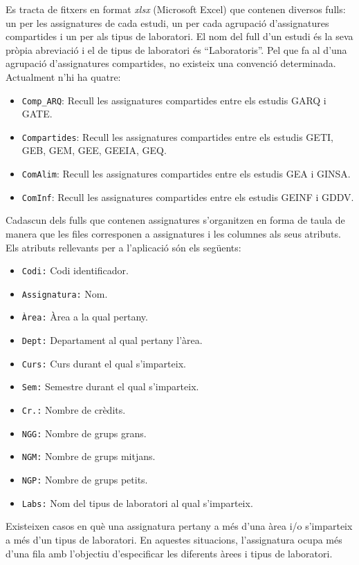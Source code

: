 \documentclass[a4paper,12pt]{ThesisStyle}
\begin{document}
Es tracta de fitxers en format \emph{xlsx} (Microsoft Excel) que contenen diversos fulls: un per les assignatures de cada estudi, un per cada agrupació d'assignatures compartides i un per als tipus de laboratori. El nom del full d'un estudi és la seva pròpia abreviació i el de tipus de laboratori és ``Laboratoris''. Pel que fa al d'una agrupació d'assignatures compartides, no existeix una convenció determinada. Actualment n'hi ha quatre:
\begin{itemize}
  \item \texttt{Comp\_ARQ}: Recull les assignatures compartides entre els estudis GARQ i GATE.
  \item \texttt{Compartides}: Recull les assignatures compartides entre els estudis GETI, GEB, GEM, GEE, GEEIA, GEQ.
  \item \texttt{ComAlim}: Recull les assignatures compartides entre els estudis GEA i GINSA.
  \item \texttt{ComInf}: Recull les assignatures compartides entre els estudis GEINF i GDDV.
\end{itemize}

Cadascun dels fulls que contenen assignatures s'organitzen en forma de taula de manera que les files corresponen a assignatures i les columnes als seus atributs. Els atributs rellevants per a l'aplicació són els següents:
\begin{itemize}
  \item \texttt{Codi:} Codi identificador.
  \item \texttt{Assignatura:} Nom.
  \item \texttt{Àrea:} Àrea a la qual pertany.
  \item \texttt{Dept:} Departament al qual pertany l'àrea.
  \item \texttt{Curs:} Curs durant el qual s'imparteix.
  \item \texttt{Sem:} Semestre durant el qual s'imparteix.
  \item \texttt{Cr.:} Nombre de crèdits.
  \item \texttt{NGG:} Nombre de grups grans.
  \item \texttt{NGM:} Nombre de grups mitjans.
  \item \texttt{NGP:} Nombre de grups petits.
  \item \texttt{Labs:} Nom del tipus de laboratori al qual s'imparteix.
\end{itemize}

Existeixen casos en què una assignatura pertany a més d'una àrea i/o s'imparteix a més d'un tipus de laboratori. En aquestes situacions, l'assignatura ocupa més d'una fila amb l'objectiu d'especificar les diferents àrees i tipus de laboratori.
\end{document}
